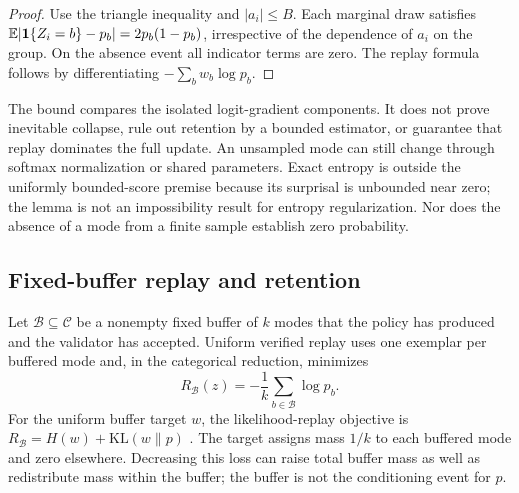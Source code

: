 \begin{proof}
\enforcehalffinalproseline
Use the triangle inequality and $|a_i|\le B$. Each marginal draw satisfies
$\mathbb E|\mathbf 1\{Z_i=b\}-p_b|=2p_b(1-p_b)$, irrespective of the dependence of
$a_i$ on the group. On the absence event all indicator terms are zero.
The replay formula follows by differentiating $-\sum_b w_b\log p_b$.
\end{proof}

The bound compares the isolated logit-gradient components. It does not prove
inevitable collapse, rule out retention by a bounded estimator, or guarantee
that replay dominates the full update. An unsampled mode can still change
through softmax normalization or shared parameters. Exact entropy is outside
the uniformly bounded-score premise because its surprisal is unbounded near
zero; the lemma is not an impossibility result for entropy regularization.
Nor does the absence of a mode from a finite sample establish zero probability.

\subsection{Fixed-buffer replay and retention}
\label{app:theory-replay}

Let $\mathcal B\subseteq\mathcal C$ be a nonempty fixed buffer of $k$ modes that
the policy has produced and the validator has accepted. Uniform verified replay
uses one exemplar per buffered mode and, in the categorical reduction, minimizes
\begin{equation}
  R_{\mathcal B}(z)
  =-\frac1k\sum_{b\in\mathcal B}\log p_b.
  \label{eq:verified-replay-loss}
\end{equation}
For the uniform buffer target $w$, the likelihood-replay objective is
$R_{\mathcal B}=H(w)+\mathrm{KL}(w\|p)$
\citep[App.~D.1, v4]{li2025divergence}. The target assigns mass
$1/k$ to each buffered mode and zero elsewhere. Decreasing this loss can raise
total buffer mass as well as redistribute mass within the buffer; the buffer is
not the conditioning event for $p$.

